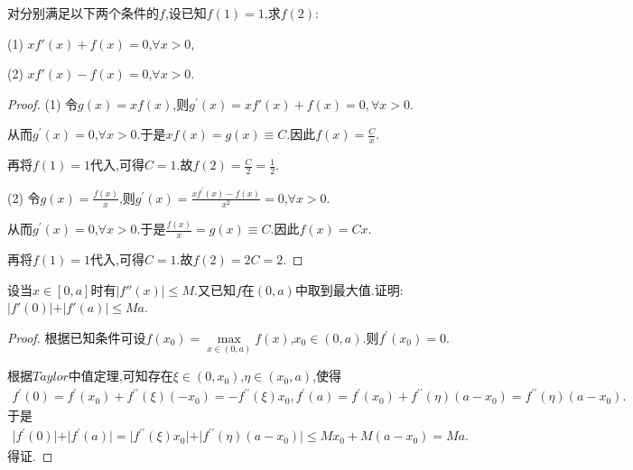 \documentclass[lang=cn,newtx,10pt,scheme=chinese]{../Template/elegantbook}
\begin{document}
\begin{exercise}
    对分别满足以下两个条件的\(f\),设已知\(f(1)=1\),求\(f(2)\):

    (1) \(xf'(x)+f(x)=0\),\(\forall x > 0\),

    (2) \(xf'(x)-f(x)=0\),\(\forall x > 0\).
\end{exercise}
\begin{proof}
    (1) 令\(g(x) = xf(x)\),则\(g^{\prime}(x) =xf\prime\left( x \right) +f\left( x \right) =0,\forall x>0\).

从而\(g^{\prime}(x) = 0\),\(\forall x > 0\).于是\(xf(x) = g(x) \equiv C\).因此\(f(x) = \frac{C}{x}\).

再将\(f(1) = 1\)代入,可得\(C = 1\).故\(f(2) = \frac{C}{2} = \frac{1}{2}\).

(2) 令\(g(x) = \frac{f(x)}{x}\),则\(g^{\prime}(x) = \frac{xf^{\prime}(x) - f(x)}{x^2} = 0\),\(\forall x > 0\).

从而\(g^{\prime}(x) = 0\),\(\forall x > 0\).于是\(\frac{f(x)}{x} = g(x) \equiv C\).因此\(f(x) = Cx\).

再将\(f(1) = 1\)代入,可得\(C = 1\).故\(f(2) = 2C = 2\). 

\end{proof}

\begin{exercise}
    设当\(x\in[0,a]\)时有\(\vert f''(x)\vert\leqslant M\).又已知\(f\)在\((0,a)\)中取到最大值.证明:
    \(\vert f'(0)\vert+\vert f'(a)\vert\leqslant Ma\).
\end{exercise}
\begin{proof}
    根据已知条件可设\(f(x_0)=\underset{x\in (0,a)}{\max}f(x)\),\(x_0\in (0,a)\).则\(f^{\prime}(x_0)=0\).

根据\(Taylor\)中值定理,可知存在\(\xi \in (0,x_0)\),\(\eta \in (x_0,a)\),使得
\begin{align*}
    f^{\prime}(0)=f^{\prime}(x_0)+f^{\prime\prime}(\xi)(-x_0)=-f^{\prime\prime}(\xi)x_0,
f^{\prime}(a)=f^{\prime}(x_0)+f^{\prime\prime}(\eta)(a - x_0)=f^{\prime\prime}(\eta)(a - x_0).
\end{align*}
于是
\begin{align*}
    \vert f^{\prime}(0)\vert+\vert f^{\prime}(a)\vert=\vert f^{\prime\prime}(\xi)x_0\vert+\vert f^{\prime\prime}(\eta)(a - x_0)\vert\leqslant Mx_0 + M(a - x_0)=Ma.
\end{align*}
得证.

\end{proof}
\end{document}
